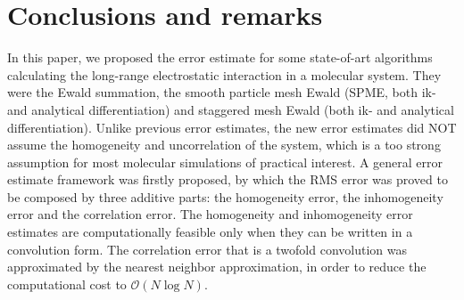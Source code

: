 \documentclass[aps,pre,preprint,unsortedaddress]{revtex4}
\begin{document}

\section{Conclusions and remarks}
\label{sec:conclusions}

In this paper, we proposed the error estimate for some state-of-art
algorithms calculating the long-range electrostatic interaction in a
molecular system. They were the Ewald summation, the smooth particle
mesh Ewald (SPME, both ik- and analytical differentiation) and
staggered mesh Ewald (both ik- and analytical differentiation).
Unlike previous error estimates, the new error estimates did NOT
assume the homogeneity and uncorrelation of the system, which is a too
strong assumption for most molecular simulations of practical
interest.  A general error estimate framework was firstly proposed, by
which the RMS error was proved to be composed by three additive parts:
the homogeneity error, the inhomogeneity error and the correlation
error.  The homogeneity and inhomogeneity error estimates are
computationally feasible 
only when they can be written in a
convolution form.  The correlation error that is a twofold
convolution was approximated by the nearest neighbor approximation, in
order to reduce the computational cost to $\mathcal O(N\log N)$.
\end{document}
